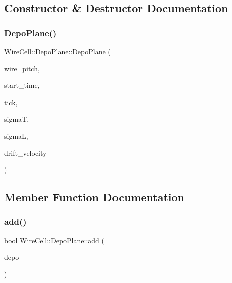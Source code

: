 \subsection{Constructor \& Destructor Documentation}
\mbox{\label{class_wire_cell_1_1_depo_plane_a4d0ce33e64a212ad9f77e5d995b4d7c8}} 
\subsubsection{\texorpdfstring{Depo\+Plane()}{DepoPlane()}}
{\footnotesize\ttfamily Wire\+Cell\+::\+Depo\+Plane\+::\+Depo\+Plane (\begin{DoxyParamCaption}\item[{\hyperlink{namespace_wire_cell_a3ab20d9b438feb7eb1ffaab9ba98af0c}{Ray}}]{wire\+\_\+pitch,  }\item[{double}]{start\+\_\+time,  }\item[{double}]{tick,  }\item[{double}]{sigmaT,  }\item[{double}]{sigmaL,  }\item[{double}]{drift\+\_\+velocity }\end{DoxyParamCaption})}



\subsection{Member Function Documentation}
\mbox{\label{class_wire_cell_1_1_depo_plane_adbcc6a073be3c7b686d79cab4eb98408}} 
\subsubsection{\texorpdfstring{add()}{add()}}
{\footnotesize\ttfamily bool Wire\+Cell\+::\+Depo\+Plane\+::add (\begin{DoxyParamCaption}\item[{\hyperlink{class_wire_cell_1_1_i_data_aff870b3ae8333cf9265941eef62498bc}{I\+Depo\+::pointer}}]{depo }\end{DoxyParamCaption})}



